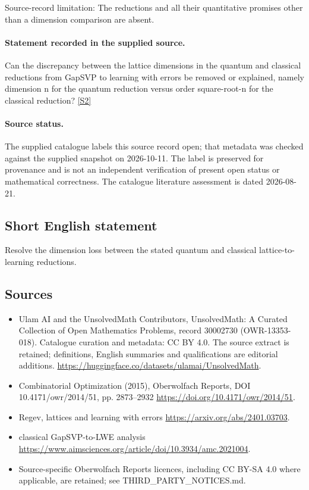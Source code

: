 \documentclass[11pt]{article}
\begin{document}
Source-record limitation: The reductions and all their quantitative promises other than a dimension comparison are absent.
\paragraph{Statement recorded in the supplied source.}
Can the discrepancy between the lattice dimensions in the quantum and classical reductions from GapSVP to learning with errors be removed or explained, namely dimension n for the quantum reduction versus order square-root-n for the classical reduction? \href{https://doi.org/10.4171/owr/2014/51}{[S2]}
\paragraph{Source status.}
The supplied catalogue labels this source record open; that metadata was checked against the supplied snapshot on 2026-10-11. The label is preserved for provenance and is not an independent verification of present open status or mathematical correctness. The catalogue literature assessment is dated 2026-08-21.
\subsection{Short English statement}
Resolve the dimension loss between the stated quantum and classical lattice-to-learning reductions.
\subsection{Sources}
\begin{itemize}
\item[S1] Ulam AI and the UnsolvedMath Contributors, UnsolvedMath: A Curated Collection of Open Mathematics Problems, record 30002730 (OWR-13353-018). Catalogue curation and metadata: CC BY 4.0. The source extract is retained; definitions, English summaries and qualifications are editorial additions.
\url{https://huggingface.co/datasets/ulamai/UnsolvedMath}.
\item[S2] Combinatorial Optimization (2015), Oberwolfach Reports, DOI 10.4171/owr/2014/51, pp. 2873--2932
\url{https://doi.org/10.4171/owr/2014/51}.
\item[S3] Regev, lattices and learning with errors
\url{https://arxiv.org/abs/2401.03703}.
\item[S4] classical GapSVP-to-LWE analysis
\url{https://www.aimsciences.org/article/doi/10.3934/amc.2021004}.
\item Source-specific Oberwolfach Reports licences, including CC BY-SA 4.0 where applicable, are retained; see THIRD\_PARTY\_NOTICES.md.
\end{itemize}
\end{document}
